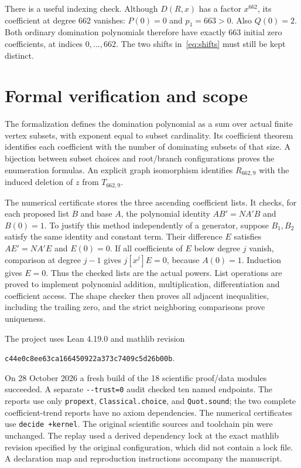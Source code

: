 \documentclass[11pt]{article}
\newcommand{\D}{D}
\begin{document}
There is a useful indexing check. Although $\D(R,x)$ has a factor $x^{662}$, its coefficient at degree $662$ vanishes: $P(0)=0$ and $p_1=663>0$. Also $Q(0)=2$. Both ordinary domination polynomials therefore have exactly $663$ initial zero coefficients, at indices $0,\ldots,662$. The two shifts in~\eqref{eq:shifts} must still be kept distinct.

\section{Formal verification and scope}\label{sec:formal}
The formalization defines the domination polynomial as a sum over actual finite vertex subsets, with exponent equal to subset cardinality. Its coefficient theorem identifies each coefficient with the number of dominating subsets of that size. A bijection between subset choices and root/branch configurations proves the enumeration formulas. An explicit graph isomorphism identifies $R_{662,9}$ with the induced deletion of $z$ from $T_{662,9}$.

The numerical certificate stores the three ascending coefficient lists. It checks, for each proposed list $B$ and base $A$, the polynomial identity $AB'=NA'B$ and $B(0)=1$. To justify this method independently of a generator, suppose $B_1,B_2$ satisfy the same identity and constant term. Their difference $E$ satisfies $AE'=NA'E$ and $E(0)=0$. If all coefficients of $E$ below degree $j$ vanish, comparison at degree $j-1$ gives $j[x^j]E=0$, because $A(0)=1$. Induction gives $E=0$. Thus the checked lists are the actual powers. List operations are proved to implement polynomial addition, multiplication, differentiation and coefficient access. The shape checker then proves all adjacent inequalities, including the trailing zero, and the strict neighboring comparisons prove uniqueness.

The project uses Lean 4.19.0 and mathlib revision
\begin{center}\texttt{\small c44e0c8ee63ca166450922a373c7409c5d26b00b}.\end{center}
On 28 October 2026 a fresh build of the 18 scientific proof/data modules succeeded. A separate \texttt{-{}-trust=0} audit checked ten named endpoints. The reports use only \texttt{propext}, \texttt{Classical.choice}, and \texttt{Quot.sound}; the two complete coefficient-trend reports have no axiom dependencies. The numerical certificates use \texttt{decide +kernel}. The original scientific sources and toolchain pin were unchanged. The replay used a derived dependency lock at the exact mathlib revision specified by the original configuration, which did not contain a lock file. A declaration map and reproduction instructions accompany the manuscript.
\end{document}
